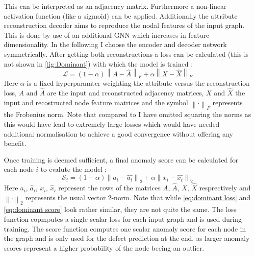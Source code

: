 \documentclass[11pt,a4paper]{article}
\begin{document}
This can be interpreted as an adjacency matrix. 
Furthermore a non-linear activation function (like a sigmoid) can be applied.  
Additionally the attribute reconstruction decoder aims to reproduce the nodal features of the input graph. 
This is done by use of an additional GNN which increases in feature dimensionality. 
In the following I choose the encoder and decoder network symmetrically. 
After getting both reconstructions a loss can be calculated (this is not shown in \autoref{fig:Dominant}) with which the model is trained \cite{dingDeepAnomalyDetection2019}:
\begin{equation}
    \label{eq:dominant loss}
    \mathcal{L} = (1-\alpha) \left\lVert A-\hat{A} \right\rVert _F + \alpha  \left\lVert X-\hat{X} \right\rVert _F
\end{equation}
Here $\alpha$ is a fixed hyperparamter weighting the attribute versus the reconstruction loss, $A$ and $\hat{A}$ are the input and reconstructed adjacency matrices, $X$ and $\hat{X}$ the input and recostructed node feature matrices and the symbol $\left\lVert\cdot  \right\rVert _F$ represents the Frobenius norm. 
Note that compared to \cite{dingDeepAnomalyDetection2019} I have omitted squaring the norms as this would have lead to extremely large losses which would have needed additional normalisation to achieve a good convergence without offering any benefit. 

Once training is deemed sufficient, a final anomaly score can be calculated for each node $i$ to evalute the model \cite{dingDeepAnomalyDetection2019}:
\begin{equation}
    \label{eq:dominant score}
    \mathcal{S}_i = (1-\alpha) \left\lVert a_i-\hat{a_i} \right\rVert _2 + \alpha  \left\lVert x_i-\hat{x_i} \right\rVert _2
\end{equation}
Here $a_i$, $\hat{a}_i$, $x_i$, $\hat{x}_i$ represent the rows of the matrices $A$, $\hat{A}$, $X$, $\hat{X}$ resprectively and $\left\lVert\cdot  \right\rVert _2$ represents the usual vector 2-norm. 
Note that while \autoref{eq:dominant loss} and \autoref{eq:dominant score} look rather similar, they are not quite the same. 
The loss function copmputes a single scalar loss for each input graph and is used during training. 
The score function computes one scalar anomaly score for each node in the graph and is only used for the defect prediction at the end, as larger anomaly scores represent a higher probability of the node beeing an outlier. 
\end{document}
